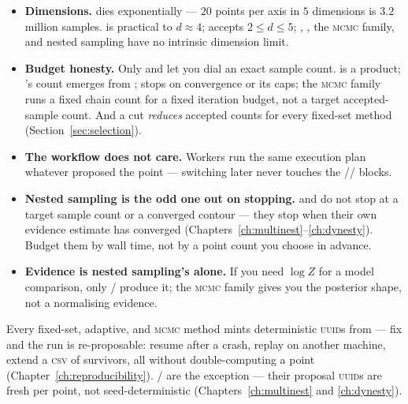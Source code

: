 \begin{itemize}
  \item \textbf{Dimensions.}  dies exponentially --- $20$ points per axis
        in $5$ dimensions is $3.2$ million samples.  is practical to
        $d\approx4$;  accepts $2 \le d \le 5$;
        , , the \textsc{mcmc} family, and nested sampling
        have no intrinsic dimension limit.
  \item \textbf{Budget honesty.} Only  and  let you dial an
        exact sample count.  is a product; 's count
        emerges from ;  stops on convergence
        or its caps; the \textsc{mcmc} family runs a fixed chain count for a fixed
        iteration budget, not a target accepted-sample count. And a 
        cut \emph{reduces} accepted counts for every fixed-set method
        (Section~\ref{sec:selection}).
  \item \textbf{The workflow does not care.} Workers run the same execution plan
        whatever proposed the point --- switching  later never touches
        the // blocks.
  \item \textbf{Nested sampling is the odd one out on stopping.}  and
         do not stop at a target sample count or a converged
        contour --- they stop when their own evidence estimate has converged
        (Chapters~\ref{ch:multinest}--\ref{ch:dynesty}). Budget them by wall time,
        not by a point count you choose in advance.
  \item \textbf{Evidence is nested sampling's alone.} If you need $\log Z$ for a model
        comparison, only / produce it; the
        \textsc{mcmc} family gives you the posterior shape, not a normalising evidence.
\end{itemize}

\begin{jtip}
Every fixed-set, adaptive, and \textsc{mcmc} method mints deterministic \textsc{uuid}s
from  --- fix  and the run is re-proposable:
resume after a crash, replay on another machine, extend a \textsc{csv} of survivors, all
without double-computing a point (Chapter~\ref{ch:reproducibility}).
/ are the exception --- their proposal \textsc{uuid}s
are fresh per point, not seed-deterministic (Chapters~\ref{ch:multinest} and
\ref{ch:dynesty}).
\end{jtip}
